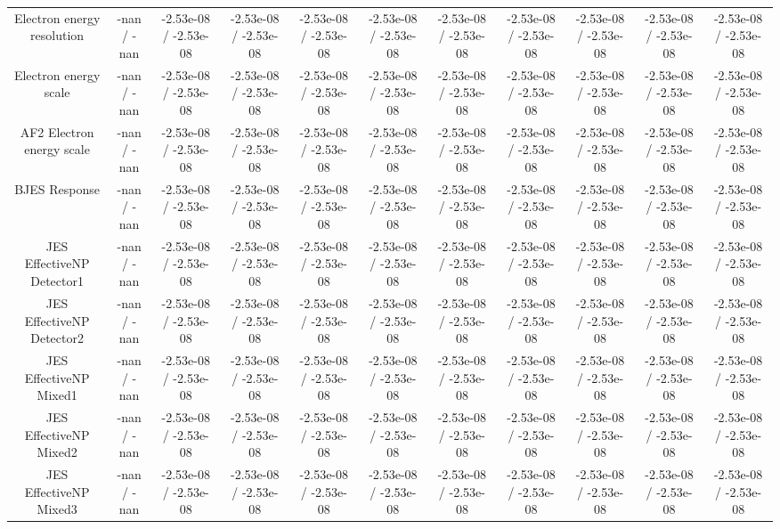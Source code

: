 \begin{table}[htbp]
\begin{center}
\begin{tabular}{|c|c|c|c|c|c|c|c|c|c|c|}
  Electron energy resolution & -nan / -nan & -2.53e-08 / -2.53e-08 & -2.53e-08 / -2.53e-08 & -2.53e-08 / -2.53e-08 & -2.53e-08 / -2.53e-08 & -2.53e-08 / -2.53e-08 & -2.53e-08 / -2.53e-08 & -2.53e-08 / -2.53e-08 & -2.53e-08 / -2.53e-08 & -2.53e-08 / -2.53e-08 \\ 
  Electron energy scale & -nan / -nan & -2.53e-08 / -2.53e-08 & -2.53e-08 / -2.53e-08 & -2.53e-08 / -2.53e-08 & -2.53e-08 / -2.53e-08 & -2.53e-08 / -2.53e-08 & -2.53e-08 / -2.53e-08 & -2.53e-08 / -2.53e-08 & -2.53e-08 / -2.53e-08 & -2.53e-08 / -2.53e-08 \\ 
  AF2 Electron energy scale & -nan / -nan & -2.53e-08 / -2.53e-08 & -2.53e-08 / -2.53e-08 & -2.53e-08 / -2.53e-08 & -2.53e-08 / -2.53e-08 & -2.53e-08 / -2.53e-08 & -2.53e-08 / -2.53e-08 & -2.53e-08 / -2.53e-08 & -2.53e-08 / -2.53e-08 & -2.53e-08 / -2.53e-08 \\ 
  BJES Response & -nan / -nan & -2.53e-08 / -2.53e-08 & -2.53e-08 / -2.53e-08 & -2.53e-08 / -2.53e-08 & -2.53e-08 / -2.53e-08 & -2.53e-08 / -2.53e-08 & -2.53e-08 / -2.53e-08 & -2.53e-08 / -2.53e-08 & -2.53e-08 / -2.53e-08 & -2.53e-08 / -2.53e-08 \\ 
  JES EffectiveNP Detector1 & -nan / -nan & -2.53e-08 / -2.53e-08 & -2.53e-08 / -2.53e-08 & -2.53e-08 / -2.53e-08 & -2.53e-08 / -2.53e-08 & -2.53e-08 / -2.53e-08 & -2.53e-08 / -2.53e-08 & -2.53e-08 / -2.53e-08 & -2.53e-08 / -2.53e-08 & -2.53e-08 / -2.53e-08 \\ 
  JES EffectiveNP Detector2 & -nan / -nan & -2.53e-08 / -2.53e-08 & -2.53e-08 / -2.53e-08 & -2.53e-08 / -2.53e-08 & -2.53e-08 / -2.53e-08 & -2.53e-08 / -2.53e-08 & -2.53e-08 / -2.53e-08 & -2.53e-08 / -2.53e-08 & -2.53e-08 / -2.53e-08 & -2.53e-08 / -2.53e-08 \\ 
  JES EffectiveNP Mixed1 & -nan / -nan & -2.53e-08 / -2.53e-08 & -2.53e-08 / -2.53e-08 & -2.53e-08 / -2.53e-08 & -2.53e-08 / -2.53e-08 & -2.53e-08 / -2.53e-08 & -2.53e-08 / -2.53e-08 & -2.53e-08 / -2.53e-08 & -2.53e-08 / -2.53e-08 & -2.53e-08 / -2.53e-08 \\ 
  JES EffectiveNP Mixed2 & -nan / -nan & -2.53e-08 / -2.53e-08 & -2.53e-08 / -2.53e-08 & -2.53e-08 / -2.53e-08 & -2.53e-08 / -2.53e-08 & -2.53e-08 / -2.53e-08 & -2.53e-08 / -2.53e-08 & -2.53e-08 / -2.53e-08 & -2.53e-08 / -2.53e-08 & -2.53e-08 / -2.53e-08 \\ 
  JES EffectiveNP Mixed3 & -nan / -nan & -2.53e-08 / -2.53e-08 & -2.53e-08 / -2.53e-08 & -2.53e-08 / -2.53e-08 & -2.53e-08 / -2.53e-08 & -2.53e-08 / -2.53e-08 & -2.53e-08 / -2.53e-08 & -2.53e-08 / -2.53e-08 & -2.53e-08 / -2.53e-08 & -2.53e-08 / -2.53e-08 \\ 

\end{tabular}
\end{center}
\end{table}
